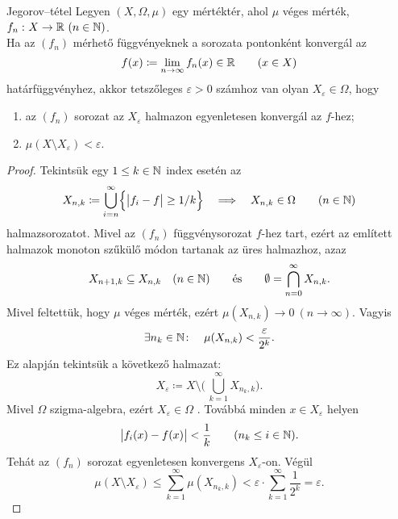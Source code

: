 \documentclass[
]{elteikthesis}[2024/04/26]
\begin{document}
	\newpage
	
	\begin{theorem}{Jegorov--tétel}{}
		Legyen \( (X, \Omega, \mu) \) egy mértéktér, ahol \( \mu \) véges mérték,
		\( f_n \,\colon X \to \mathbb{R} \ (n \in \mathbb{N}) \).\\[6pt]
		Ha az \( (f_n) \) mérhető függvényeknek a sorozata pontonként konvergál az
		\[
			f(x) \coloneq \lim_{n \to \infty} f_n(x) \in \mathbb{R} \qquad (x \in X)
		\]
		határfüggvényhez, 
		akkor tetszőleges \( \varepsilon > 0 \) számhoz van olyan 
		\( X_\varepsilon \in \Omega \), hogy
		\begin{enumerate}[label=\alph*)]
			\item az \( (f_n) \) sorozat az \( X_\varepsilon \) halmazon 
			egyenletesen konvergál az \( f \)-hez;
			\item \( \mu( X \setminus X_\varepsilon ) < \varepsilon \).
		\end{enumerate}
	\end{theorem}
	\begin{proof}
		Tekintsük egy \( 1 \leq k \in \mathbb{N} \) index esetén az
		\[
			X_{n,k} \coloneq \bigcup_{i=n}^{\infty} \Bigl\{ \abs\big{f_i - f} \geq 1 / k \Bigr\}
			\quad \Longrightarrow \quad
			X_{n,k} \in \Omega \qquad (n \in \mathbb{N})
		\]
		halmazsorozatot.
		Mivel az \( (f_n) \) függvénysorozat \( f \)-hez tart, 
		ezért az említett halmazok monoton szűkülő módon tartanak az üres halmazhoz, azaz
		\[
			X_{n+1, k} \subseteq X_{n, k} \quad (n \in \mathbb{N})
			\qquad \text{és} \qquad
			\emptyset = \bigcap_{n=0}^{\infty} X_{n, k}.
		\]
		Mivel feltettük, hogy \( \mu \) véges mérték, 
		ezért \( \mu(X_{n, k}) \longrightarrow 0 \ (n \to \infty) \). Vagyis
		\[
			\exists	n_k \in \mathbb{N} \colon \quad
			\mu(X_{n, k}) < \frac{\varepsilon}{2^{k}}.
		\]
		Ez alapján tekintsük a következő halmazat:
		\[
			X_\varepsilon \coloneq
			X \setminus \Biggl( \, \bigcup_{k=1}^{\infty} X_{n_k, k} \Biggr).
		\]
		Mivel \( \Omega \) szigma-algebra, ezért \( X_\varepsilon \in \Omega \) .
		Továbbá minden \( x \in X_\varepsilon \) helyen
		\[
			\abs\big{ f_i(x) - f(x) } < \frac{1}{k} \qquad (n_k \leq i \in \mathbb{N}).
		\]
		Tehát az \( (f_n) \) sorozat egyenletesen konvergens \( X_\varepsilon \)-on.
		Végül
		\[
			\mu( X \setminus X_\varepsilon ) \leq 
			\sum_{k = 1}^{\infty} \mu(X_{n_k, k}) <
			\varepsilon \cdot \sum_{k = 1}^{\infty} \frac{1}{2^k} =
			\varepsilon.
		\]
	\end{proof}
	
\end{document}
